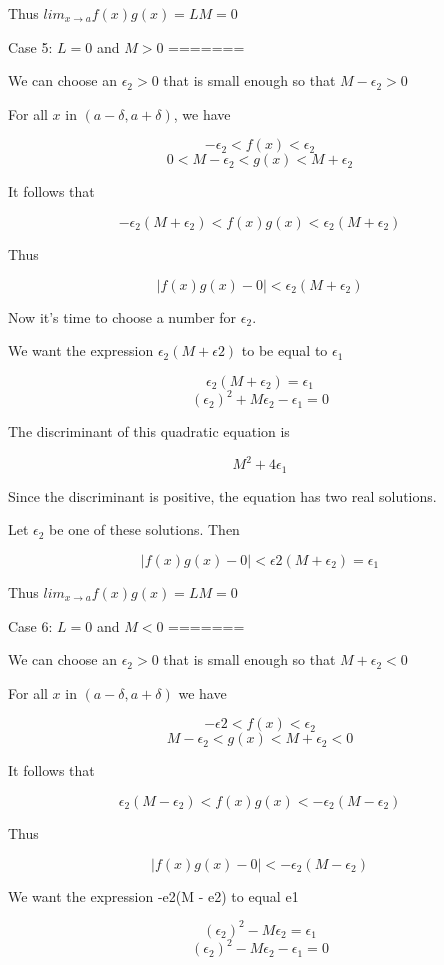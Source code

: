 Thus $lim_{x \rightarrow a} f(x)g(x) = LM = 0$

Case 5: $L = 0$ and $M > 0$
=======

We can choose an $\epsilon_2 > 0$ that is small enough so that $M - \epsilon_2 > 0$

For all $x$ in $(a - \delta, a + \delta)$, we have

    $$ -\epsilon_2 < f(x) < \epsilon_2 $$
    $$ 0 < M - \epsilon_2 < g(x) < M + \epsilon_2 $$

It follows that

    $$ -\epsilon_2(M + \epsilon_2) < f(x)g(x) < \epsilon_2(M + \epsilon_2) $$

Thus

    $$ |f(x)g(x) - 0| < \epsilon_2(M + \epsilon_2) $$

Now it's time to choose a number for $\epsilon_2$.

We want the expression $\epsilon_2(M + \epsilon2)$ to be equal to $\epsilon_1$

    $$ \epsilon_2(M + \epsilon_2) = \epsilon_1 $$
    $$ (\epsilon_2)^2 + M\epsilon_2 - \epsilon_1 = 0 $$

The discriminant of this quadratic equation is

    $$ M^2 + 4\epsilon_1 $$

Since the discriminant is positive, the equation has two real solutions.

Let $\epsilon_2$ be one of these solutions. Then 

    $$ |f(x)g(x) - 0| < \epsilon2(M + \epsilon_2) = \epsilon_1 $$

Thus $lim_{x \rightarrow a} f(x)g(x) = LM = 0 $

Case 6: $L = 0$ and $M < 0$
=======

We can choose an $\epsilon_2 > 0$ that is small enough so that $M + \epsilon_2 < 0$

For all $x$ in $(a - \delta, a + \delta)$ we have

    $$ -\epsilon2 < f(x) < \epsilon_2 $$
    $$ M - \epsilon_2 < g(x) < M + \epsilon_2 < 0 $$

It follows that

    $$ \epsilon_2(M - \epsilon_2) < f(x)g(x) < -\epsilon_2(M - \epsilon_2) $$

Thus

    $$ |f(x)g(x) - 0| < -\epsilon_2(M - \epsilon_2) $$

We want the expression -e2(M - e2) to equal e1

    $$ (\epsilon_2)^2 - M\epsilon_2 = \epsilon_1 $$
    $$ (\epsilon_2)^2 - M\epsilon_2 - \epsilon_1 = 0 $$

